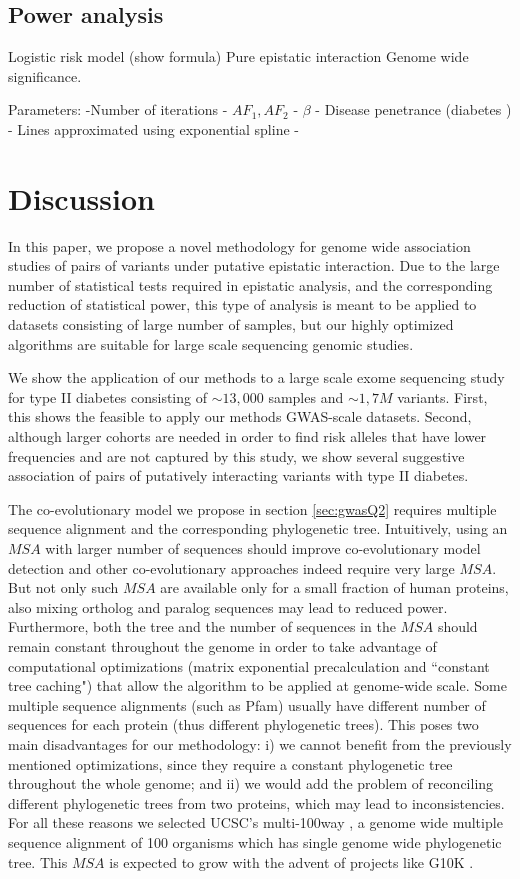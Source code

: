 \subsection{Power analysis}


Logistic risk model (show formula)
Pure epistatic interaction
Genome wide significance.

Parameters:
	-Number of iterations
	- $AF_1, AF_2$
	- $\beta$
	- Disease penetrance (diabetes \cite{REF})
	- Lines approximated using exponential spline
	- 
	

\section{Discussion}

In this paper, we propose a novel methodology for genome wide association studies of pairs of variants under putative epistatic interaction. Due to the large number of statistical tests required in epistatic analysis, and the corresponding reduction of statistical power, this type of analysis is meant to be applied to datasets consisting of large number of samples, but our highly optimized algorithms are suitable for large scale sequencing genomic studies.

We show the application of our methods to a large scale exome sequencing study for type II diabetes consisting of $\sim 13,000$ samples and $\sim 1,7M$ variants. First, this shows the feasible to apply our methods GWAS-scale datasets. 
Second, although larger cohorts are needed in order to find risk alleles that have lower frequencies and are not captured by this study, we show several suggestive association of pairs of putatively interacting variants with type II diabetes. 

The co-evolutionary model we propose in section \ref{sec:gwasQ2} requires multiple sequence alignment and the corresponding phylogenetic tree.
Intuitively, using an $MSA$ with larger number of sequences should improve co-evolutionary model detection and other co-evolutionary approaches indeed require very large $MSA$. But not only such $MSA$ are available only for a small fraction of human proteins, also mixing ortholog and paralog sequences may lead to reduced power. 
Furthermore, both the tree and the number of sequences in the $MSA$ should remain constant throughout the genome in order to take advantage of computational optimizations (matrix exponential precalculation and ``constant tree caching") that allow the algorithm to be applied at genome-wide scale. Some multiple sequence alignments (such as Pfam) usually have different number of sequences for each protein (thus different phylogenetic trees). This poses two main disadvantages for our methodology: i) we cannot benefit from the previously mentioned optimizations, since they require a constant phylogenetic tree throughout the whole genome; and ii) we would add the problem of reconciling different phylogenetic trees from two proteins, which may lead to inconsistencies. 
For all these reasons we selected UCSC's multi-100way \cite{karolchik2014ucsc}, a genome wide multiple sequence alignment of 100 organisms which has single genome wide phylogenetic tree. This $MSA$ is expected to grow with the advent of projects like G10K \cite{haussler2009genome}. 

